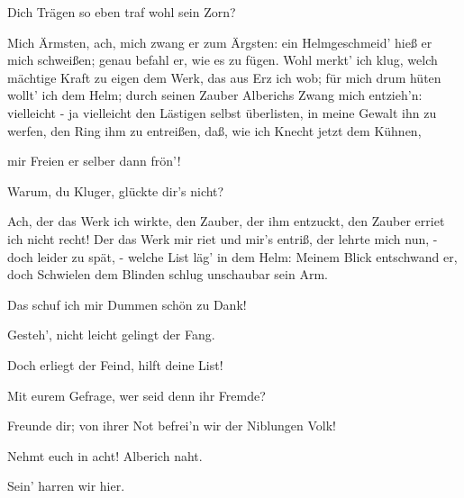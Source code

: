 \begin{drama}
\Logespeaks
Dich Trägen so eben traf wohl sein Zorn?
 

\Mimespeaks
Mich Ärmsten, ach, mich zwang er zum Ärgsten:
ein Helmgeschmeid' hieß er mich schweißen;
genau befahl er, wie es zu fügen.
Wohl merkt' ich klug, welch mächtige Kraft
zu eigen dem Werk, das aus Erz ich wob;
für mich drum hüten wollt' ich dem Helm;
durch seinen Zauber
Alberichs Zwang mich entzieh'n:
vielleicht - ja vielleicht
den Lästigen selbst überlisten,
in meine Gewalt ihn zu werfen,
den Ring ihm zu entreißen,
daß, wie ich Knecht jetzt dem Kühnen,
 



mir Freien er selber dann frön'!
 

\Logespeaks
Warum, du Kluger, glückte dir's nicht?
 

\Mimespeaks
Ach, der das Werk ich wirkte,
den Zauber, der ihm entzuckt,
den Zauber erriet ich nicht recht!
Der das Werk mir riet und mir's entriß,
der lehrte mich nun,
- doch leider zu spät, -
welche List läg' in dem Helm:
Meinem Blick entschwand er,
doch Schwielen dem Blinden
schlug unschaubar sein Arm.
 



Das schuf ich mir Dummen schön zu Dank!
 




\Logespeaks


Gesteh', nicht leicht gelingt der Fang.
 

\Wotanspeaks
Doch erliegt der Feind, hilft deine List!
 

\Mimespeaks


Mit eurem Gefrage,
wer seid denn ihr Fremde?
 

\Logespeaks
Freunde dir; von ihrer Not
befrei'n wir der Niblungen Volk!
 

\Mimespeaks


Nehmt euch in acht! Alberich naht.
 

\Wotanspeaks
Sein' harren wir hier.
 





\end{drama}
